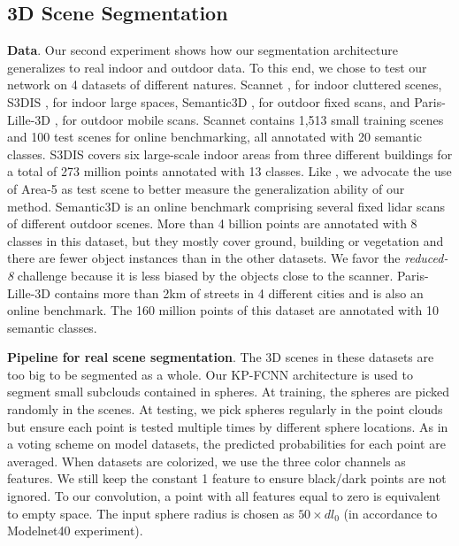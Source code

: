 \documentclass[10pt,twocolumn,letterpaper]{article}
\begin{document}
\subsection{3D Scene Segmentation}
\label{section_42}

\noindent
\textbf{Data}. Our second experiment shows how our segmentation architecture generalizes to real indoor and outdoor data. To this end, we chose to test our network on 4 datasets of different natures. Scannet \cite{dai2017scannet}, for indoor cluttered scenes, S3DIS \cite{armeni20163d}, for indoor large spaces, Semantic3D \cite{hackel2017semantic3d}, for outdoor fixed scans, and Paris-Lille-3D \cite{roynard2018paris}, for outdoor mobile scans. Scannet contains 1,513 small training scenes and 100 test scenes for online benchmarking, all annotated with 20 semantic classes. S3DIS covers six large-scale indoor areas from three different buildings for a total of 273 million points annotated with 13 classes. Like \cite{tchapmi2017segcloud}, we advocate the use of Area-5 as test scene to better measure the generalization ability of our method. Semantic3D is an online benchmark comprising several fixed lidar scans of different outdoor scenes. More than 4 billion points are annotated with 8 classes in this dataset, but they mostly cover ground, building or vegetation and there are fewer object instances than in the other datasets. We favor the \textit{reduced-8} challenge because it is less biased by the objects close to the scanner. Paris-Lille-3D contains more than 2km of streets in 4 different cities and is also an online benchmark. The 160 million points of this dataset are annotated with 10 semantic classes.



\noindent
\textbf{Pipeline for real scene segmentation}. The 3D scenes in these datasets are too big to be segmented as a whole. Our KP-FCNN architecture is used to segment small subclouds contained in spheres. At training, the spheres are picked randomly in the scenes. At testing, we pick spheres regularly in the point clouds but ensure each point is tested multiple times by different sphere locations. As in a voting scheme on model datasets, the predicted probabilities for each point are averaged. When datasets are colorized, we use the three color channels as features. We still keep the constant 1 feature to ensure black/dark points are not ignored. To our convolution, a point with all features equal to zero is equivalent to empty space. The input sphere radius is chosen as $50 \times {dl}_0$ (in accordance to Modelnet40 experiment).
\end{document}
